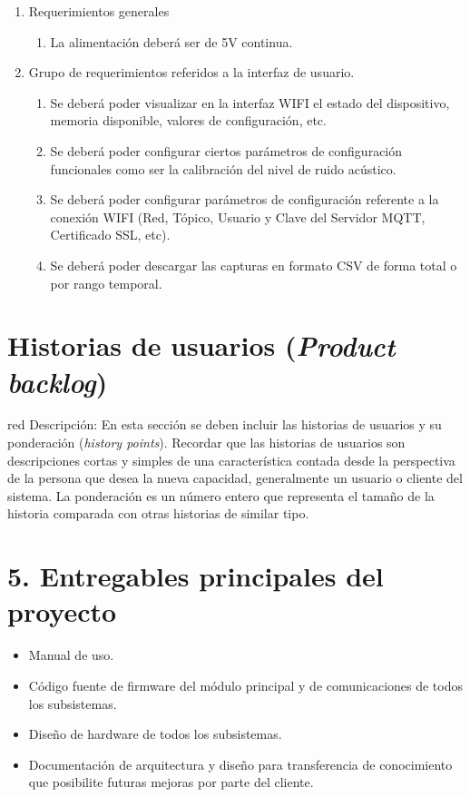 \documentclass[11pt]{charter}
\begin{document}
\begin{enumerate}
\item Requerimientos generales
  \begin{enumerate}
  \item La alimentación deberá ser de 5V continua.
  \end{enumerate}
\item Grupo de requerimientos referidos a la interfaz de usuario.
  \begin{enumerate}
  \item Se deberá poder visualizar en la interfaz WIFI el estado del dispositivo, memoria disponible, valores de configuración, etc.
  \item Se deberá poder configurar ciertos parámetros de configuración funcionales como
ser la calibración del nivel de ruido acústico.
  \item Se deberá poder configurar parámetros de configuración referente a la conexión WIFI
(Red, Tópico, Usuario y Clave del Servidor MQTT, Certificado SSL, etc).
  \item Se deberá poder descargar las capturas en formato CSV de forma total o por rango
temporal.
  \end{enumerate}
\end{enumerate}

\section{Historias de usuarios (\textit{Product backlog})}
\label{sec:backlog}

\begin{consigna}{red}
Descripción: En esta sección se deben incluir las historias de usuarios y su ponderación (\textit{history points}). Recordar que las historias de usuarios son descripciones cortas y simples de una característica contada desde la perspectiva de la persona que desea la nueva capacidad, generalmente un usuario o cliente del sistema. La ponderación es un número entero que representa el tamaño de la historia comparada con otras historias de similar tipo.
\end{consigna}

\section{5. Entregables principales del proyecto}
\label{sec:entregables}

\begin{itemize}
\item Manual de uso.
\item Código fuente de firmware del módulo principal y de comunicaciones de todos los subsistemas.
\item Diseño de hardware de todos los subsistemas.
\item Documentación de arquitectura y diseño para transferencia de conocimiento que posibilite
futuras mejoras por parte del cliente.
\end{itemize}
\end{document}
